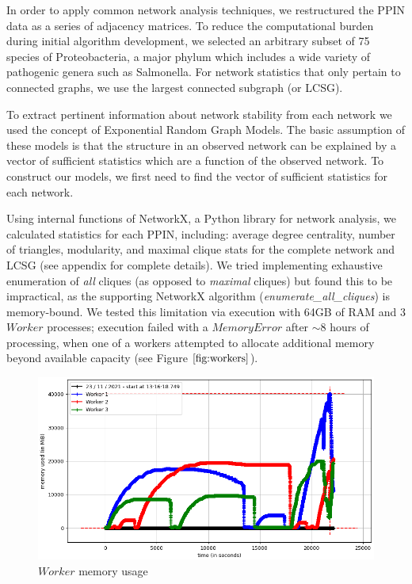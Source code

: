 \documentclass[12pt]{article}
\begin{document}
In order to apply common network analysis techniques, we restructured the PPIN data as a series of adjacency matrices. To reduce the computational burden during initial algorithm development, we selected an arbitrary subset of 75 species of Proteobacteria, a major phylum which includes a wide variety of pathogenic genera such as Salmonella. For network statistics that only pertain to connected graphs, we use the largest connected subgraph (or LCSG).

To extract pertinent information about network stability from each network we used the concept of Exponential Random Graph Models. The basic assumption of these models is that the structure in an observed network can be explained by a vector of sufficient statistics which are a function of the observed network. To construct our models, we first need to find the vector of sufficient statistics for each network.

Using internal functions of NetworkX, a Python library for network analysis, we calculated statistics for each PPIN, including: average degree centrality, number of triangles, modularity, and maximal clique stats for the complete network and LCSG (see appendix for complete details). We tried implementing exhaustive enumeration of \textit{all} cliques (as opposed to \textit{maximal} cliques) but found this to be impractical, as the supporting NetworkX algorithm (\textit{enumerate\_all\_cliques}) is memory-bound. We tested this limitation via execution with 64GB of RAM and 3 $Worker$ processes; execution failed with a $MemoryError$ after $\sim8$ hours of processing, when one of a workers attempted to allocate additional memory beyond available capacity (see Figure $\ref{fig:workers}$).

\begin{figure}
  \includegraphics[width=1\linewidth]{workers}
  \caption{$Worker$ memory usage}
  \label{fig:workers}
\end{figure}
\end{document}
